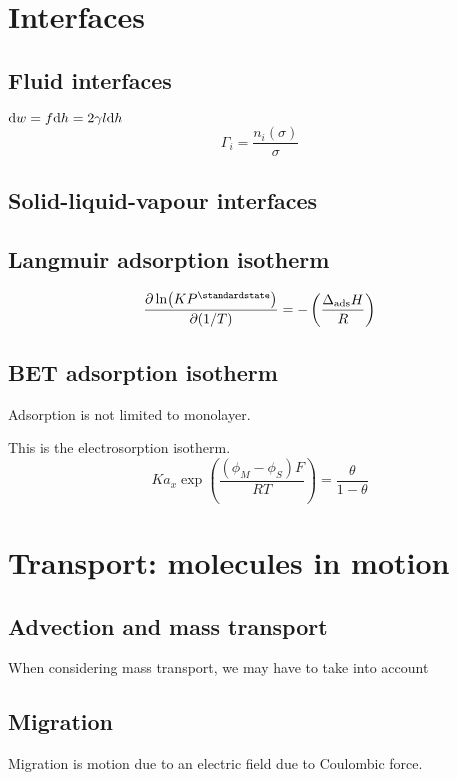 \section{Interfaces}

\subsection*{Fluid interfaces} %
$\differential w = f \differential h = 2 \gamma l \differential h$
\begin{equation*}
    \Gamma_i = \frac{n_i(\sigma)}{\sigma}
\end{equation*}

\subsection*{Solid-liquid-vapour interfaces}

\subsection*{Langmuir adsorption isotherm}
\begin{equation*}
    \pdv{\ln(KP^\standardstate)}{(1/T)} = - \left(\frac{\Delta_{\textrm{ads}}H}{R}\right)
\end{equation*}

\subsection*{BET adsorption isotherm}
Adsorption is not limited to monolayer.

This is the electrosorption isotherm.
\begin{equation*}
    Ka_x \exp(\frac{(\phi_M - \phi_S)F}{RT}) = \frac{\theta}{1 - \theta}
\end{equation*}

\section{Transport: molecules in motion}

\subsection*{Advection and mass transport}

When considering mass transport, we may have to take into account

\subsection*{Migration}
Migration is motion due to an electric field due to Coulombic force.

